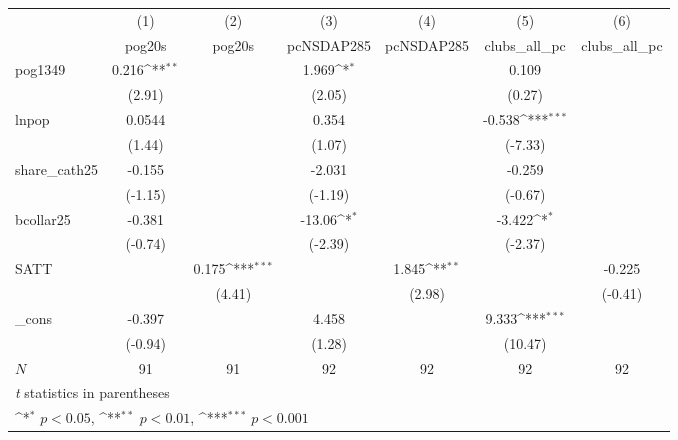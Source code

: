 {
\def\sym#1{\ifmmode^{#1}\else\(^{#1}\)\fi}
\begin{tabular}{l*{6}{c}}
\hline\hline
            &\multicolumn{1}{c}{(1)}&\multicolumn{1}{c}{(2)}&\multicolumn{1}{c}{(3)}&\multicolumn{1}{c}{(4)}&\multicolumn{1}{c}{(5)}&\multicolumn{1}{c}{(6)}\\
            &\multicolumn{1}{c}{pog20s}&\multicolumn{1}{c}{pog20s}&\multicolumn{1}{c}{pcNSDAP285}&\multicolumn{1}{c}{pcNSDAP285}&\multicolumn{1}{c}{clubs\_all\_pc}&\multicolumn{1}{c}{clubs\_all\_pc}\\
\hline
pog1349     &       0.216\sym{**} &                     &       1.969\sym{*}  &                     &       0.109         &                     \\
            &      (2.91)         &                     &      (2.05)         &                     &      (0.27)         &                     \\
[1em]
lnpop       &      0.0544         &                     &       0.354         &                     &      -0.538\sym{***}&                     \\
            &      (1.44)         &                     &      (1.07)         &                     &     (-7.33)         &                     \\
[1em]
share\_cath25&      -0.155         &                     &      -2.031         &                     &      -0.259         &                     \\
            &     (-1.15)         &                     &     (-1.19)         &                     &     (-0.67)         &                     \\
[1em]
bcollar25   &      -0.381         &                     &      -13.06\sym{*}  &                     &      -3.422\sym{*}  &                     \\
            &     (-0.74)         &                     &     (-2.39)         &                     &     (-2.37)         &                     \\
[1em]
SATT        &                     &       0.175\sym{***}&                     &       1.845\sym{**} &                     &      -0.225         \\
            &                     &      (4.41)         &                     &      (2.98)         &                     &     (-0.41)         \\
[1em]
\_cons      &      -0.397         &                     &       4.458         &                     &       9.333\sym{***}&                     \\
            &     (-0.94)         &                     &      (1.28)         &                     &     (10.47)         &                     \\
\hline
\(N\)       &          91         &          91         &          92         &          92         &          92         &          92         \\
\hline\hline
\multicolumn{7}{l}{\footnotesize \textit{t} statistics in parentheses}\\
\multicolumn{7}{l}{\footnotesize \sym{*} \(p<0.05\), \sym{**} \(p<0.01\), \sym{***} \(p<0.001\)}\\
\end{tabular}
}
